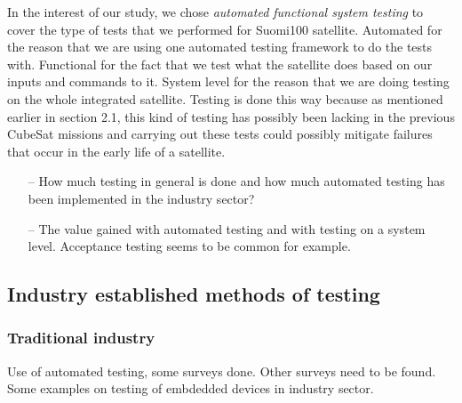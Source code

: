 \documentclass[english,12pt,a4paper,pdftex,elec,utf8]{aaltothesis}
\begin{document}
\vspace{5mm}
In the interest of our study, we chose \textit{automated functional system testing} to cover the type of tests that we performed for Suomi100 satellite. Automated for the reason that we are using one automated testing framework to do the tests with. Functional for the fact that we test what the satellite does based on our inputs and commands to it. System level for the reason that we are doing testing on the whole integrated satellite. Testing is done this way because as mentioned earlier in section 2.1, this kind of testing has possibly been lacking in the previous CubeSat missions and carrying out these tests could possibly mitigate failures that occur in the early life of a satellite.
\begin{itemize}
\item[--]How much testing in general is done and how much automated testing has been implemented in the industry sector?
\item[--]The value gained with automated testing and with testing on a system level. Acceptance testing seems to be common for example.
\end{itemize}
\subsection{Industry established methods of testing}
\subsubsection{Traditional industry}
Use of automated testing, some surveys done. Other surveys need to be found.
Some examples on testing of embdedded devices in industry sector.\par 
\end{document}
